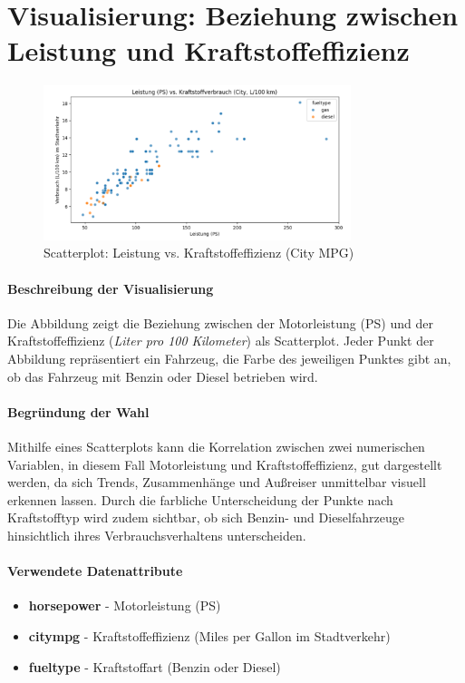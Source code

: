 \documentclass[a4paper,12pt]{article}
\begin{document}
\section{Visualisierung: Beziehung zwischen Leistung und Kraftstoffeffizienz}
\begin{figure}[H]
    \centering
    \includegraphics[width=0.8\textwidth]{../images/leistung_vs_kraftstoffeffizienz_lp100.png} %
    \caption{Scatterplot: Leistung vs. Kraftstoffeffizienz (City MPG)}
    \label{fig:vis1}
\end{figure}

\paragraph{Beschreibung der Visualisierung} \break
Die Abbildung zeigt die Beziehung zwischen der Motorleistung (PS) und der Kraftstoffeffizienz (\textit{Liter pro 100 Kilometer}) als Scatterplot.
Jeder Punkt der Abbildung repräsentiert ein Fahrzeug, die Farbe des jeweiligen Punktes gibt an, ob das Fahrzeug mit Benzin oder Diesel betrieben wird.


\paragraph{Begründung der Wahl}
Mithilfe eines Scatterplots kann die Korrelation zwischen zwei numerischen Variablen, in diesem Fall Motorleistung und Kraftstoffeffizienz,
gut dargestellt werden, da sich Trends, Zusammenhänge und Außreiser unmittelbar visuell erkennen lassen.
Durch die farbliche Unterscheidung der Punkte nach Kraftstofftyp wird zudem sichtbar, ob sich Benzin- und Dieselfahrzeuge hinsichtlich ihres Verbrauchsverhaltens unterscheiden.


\paragraph{Verwendete Datenattribute}
\begin{itemize}
  \item \textbf{horsepower} - Motorleistung (PS)
  \item \textbf{citympg} - Kraftstoffeffizienz (Miles per Gallon im Stadtverkehr)
  \item \textbf{fueltype} - Kraftstoffart (Benzin oder Diesel)
\end{itemize}
\end{document}

